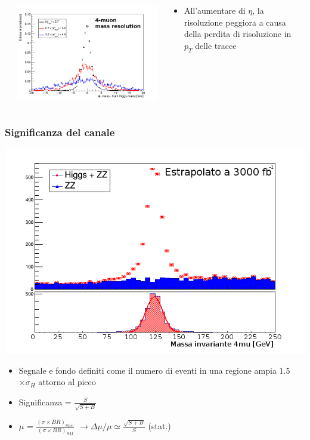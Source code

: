 \documentclass{beamer}
\begin{document}
\begin{frame}
\begin{columns}
\begin{column}{0.09\textwidth}
\end{column}
\begin{column}{0.41\textwidth}
\includegraphics[width=\textwidth]{HZZ4mu/sigRecoMass2}
\end{column}
\begin{column}{0.41\textwidth}
\begin{itemize}
\item \small All'aumentare di $\eta$, la risoluzione peggiora a causa della perdita
di risoluzione in $p_{T}$ delle tracce
\end{itemize}
\end{column}
\begin{column}{0.09\textwidth}
\end{column}
\end{columns}

\end{frame}

\begin{frame}[t]
\frametitle{Significanza del canale}
\begin{center}
\includegraphics[width=.5\textwidth]{SBInclBrl4_2}
\end{center}

\begin{itemize}
\item \small Segnale e fondo definiti come il numero di eventi in una regione ampia
\mbox{1.5 $\times \sigma_{H}$} attorno al picco
\item \small Significanza = $\frac{S}{\sqrt{S + B}}$
\item \small $\mu$ = $\frac{(\sigma \times BR)_{mis.}}{(\sigma \times BR)_{SM}}$ $\rightarrow 
\Delta\mu/\mu \simeq \frac{\sqrt{S + B}}{S}$ (stat.)
\end{itemize}
\end{frame}
\end{document}
